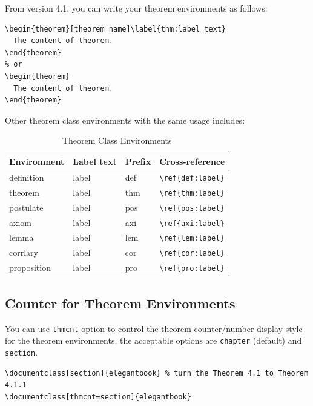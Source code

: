 \documentclass[11pt]{elegantbook}
\begin{document}
From version 4.1, you can write your theorem environments as follows:
\begin{lstlisting}
\begin{theorem}[theorem name]\label{thm:label text}
  The content of theorem.
\end{theorem}
% or
\begin{theorem}
  The content of theorem.
\end{theorem}
\end{lstlisting}

Other theorem class environments with the same usage includes:

\begin{table}[htbp]
  \centering
  \caption{Theorem Class Environments}
    \begin{tabular}{llll}
    \toprule
    Environment & Label text & Prefix & Cross-reference \\
    \midrule
    definition & label & def   & \lstinline|\ref{def:label}| \\
    theorem & label & thm   & \lstinline|\ref{thm:label}| \\
    postulate & label & pos & \lstinline|\ref{pos:label}| \\
    axiom & label & axi & \lstinline|\ref{axi:label}|\\
    lemma & label & lem   & \lstinline|\ref{lem:label}| \\
    corrlary & label & cor   & \lstinline|\ref{cor:label}| \\
    proposition & label & pro   & \lstinline|\ref{pro:label}| \\
    \bottomrule
    \end{tabular}%
  \label{tab:theorem-class}%
 \end{table}%
 
\subsection{Counter for Theorem Environments}

You can use \lstinline{thmcnt} option to control the theorem counter/number display style for the theorem environments, the acceptable options are \lstinline{chapter} (default) and \lstinline{section}. 

\begin{lstlisting}
\documentclass[section]{elegantbook} % turn the Theorem 4.1 to Theorem 4.1.1 
\documentclass[thmcnt=section]{elegantbook}
\end{lstlisting}
\end{document}
